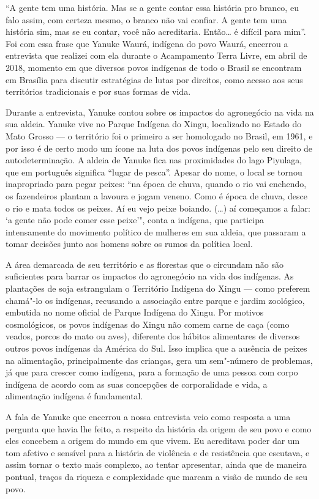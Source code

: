 ``A gente tem uma história. Mas se a gente contar essa história pro
branco, eu falo assim, com certeza mesmo, o branco não vai confiar. A
gente tem uma história sim, mas se eu contar, você não acreditaria.
Então\ldots{} é difícil para mim''. Foi com essa frase que Yanuke Waurá,
indígena do povo Waurá, encerrou a entrevista que realizei com ela
durante o Acampamento Terra Livre, em abril de 2018, momento em que
diversos povos indígenas de todo o Brasil se encontram em Brasília para
discutir estratégias de lutas por direitos, como acesso aos seus
territórios tradicionais e por suas formas de vida.

Durante a entrevista, Yanuke contou sobre os impactos do agronegócio na
vida na sua aldeia. Yanuke vive no Parque Indígena do Xingu, localizado
no Estado do Mato Grosso --- o território foi o primeiro a ser homologado
no Brasil, em 1961, e por isso é de certo modo um ícone na luta dos
povos indígenas pelo seu direito de autodeterminação. A aldeia de Yanuke
fica nas proximidades do lago Piyulaga, que em português significa
``lugar de pesca''. Apesar do nome, o local se tornou inapropriado para
pegar peixes: ``na época de chuva, quando o rio vai enchendo, os
fazendeiros plantam a lavoura e jogam veneno. Como é época de chuva,
desce o rio e mata todos os peixes. Aí eu vejo peixe boiando. (\ldots{}) aí
começamos a falar: `a gente não pode comer esse peixe'", conta a
indígena, que participa intensamente do movimento político de mulheres
em sua aldeia, que passaram a tomar decisões junto aos homens sobre os
rumos da política local.

A área demarcada de seu território e as florestas que o circundam não
são suficientes para barrar os impactos do agronegócio na vida dos
indígenas. As plantações de soja estrangulam o Território Indígena do
Xingu --- como preferem chamá"-lo os indígenas, recusando a associação
entre parque e jardim zoológico, embutida no nome oficial de Parque
Indígena do Xingu. Por motivos cosmológicos, os povos indígenas do Xingu
não comem carne de caça (como veados, porcos do mato ou aves), diferente
dos hábitos alimentares de diversos outros povos indígenas da América do
Sul. Isso implica que a ausência de peixes na alimentação,
principalmente das crianças, gera um sem"-número de problemas, já que
para crescer como indígena, para a formação de uma pessoa com corpo
indígena de acordo com as suas concepções de corporalidade e vida, a
alimentação indígena é fundamental.

A fala de Yanuke que encerrou a nossa entrevista veio como resposta a
uma pergunta que havia lhe feito, a respeito da história da origem de
seu povo e como eles concebem a origem do mundo em que vivem. Eu
acreditava poder dar um tom afetivo e sensível para a história de
violência e de resistência que escutava, e assim tornar o texto mais
complexo, ao tentar apresentar, ainda que de maneira pontual, traços da
riqueza e complexidade que marcam a visão de mundo de seu povo.

